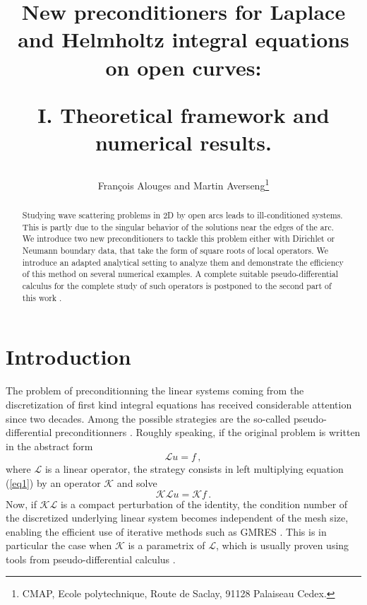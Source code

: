 \documentclass[a4paper]{article}
\title{New preconditioners for Laplace and Helmholtz integral equations on open curves: \\
	\vspace{0,5cm}
	\begin{Large}
		I. Theoretical framework and numerical results. 
	\end{Large}}
\author{Fran\c{c}ois Alouges and Martin Averseng\footnote{CMAP, Ecole polytechnique, Route de Saclay, 91128 Palaiseau Cedex.}}
\begin{document}
\maketitle

\begin{abstract}
Studying wave scattering problems in 2D by open arcs leads to ill-conditioned systems. This is partly due to the singular behavior
of the solutions near the edges of the arc. We introduce two new preconditioners to tackle this problem either with Dirichlet or Neumann 
boundary data, that take the form of square roots of local operators. We introduce an adapted analytical setting to analyze them and 
demonstrate the efficiency of this method on several numerical examples. A complete suitable pseudo-differential calculus for the
complete study of such operators is postponed to the second part of this work .
\end{abstract}

\section{Introduction}

The problem of preconditionning the linear systems coming from the discretization of first kind integral equations
has received considerable attention since two decades. Among the possible strategies are the so-called pseudo-differential 
preconditionners \cite{alouges2007stable,alouges2005new,antoine2007generalized,christiansen2002preconditioner,hiptmair2014mesh,Steinbach98}. 
Roughly speaking, if the original problem is written in the abstract form
\begin{equation}
	\mathcal{L}u=f\,,
	\label{eq1}
\end{equation}
where $\mathcal{L}$ is a linear operator, the strategy consists in left multiplying equation (\ref{eq1}) by an operator $\mathcal{K}$ and solve
\begin{equation}
	\mathcal{K}\mathcal{L}u=\mathcal{K}f\,.	
\end{equation}
Now, if $\mathcal{K}\mathcal{L}$ is a compact perturbation of the identity, the condition number of the discretized underlying linear system 
becomes independent of the mesh size, enabling the efficient use of iterative methods such as GMRES \cite{saad1986gmres}. This is in particular the 
case when $\mathcal{K}$ is a parametrix of $\mathcal{L}$, which is usually proven using tools from pseudo-differential calculus 
\cite{steinbach1998construction}.
\end{document}
